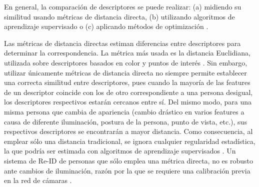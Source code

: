 \documentclass[../memoria.tex]{subfiles}
\begin{document}
En general, la comparación de descriptores se puede realizar: (a) midiendo su similitud usando métricas de distancia directa, (b) utilizando algoritmos de aprendizaje supervisado o (c) aplicando métodos de optimización \cite{mazzon2012person}.

Las métricas de distancia directas estiman diferencias entre descriptores para determinar la correspondencia. La métrica más usada es la distancia Euclidiana, utilizada sobre descriptores basados en color \cite{farenzena2010person, bak2010person} y puntos de interés \cite{gheissari2006person}. Sin embargo, utilizar únicamente métricas de distancia directa no siempre permite establecer una correcta similitud entre descriptores, pues cuando la mayoría de las features de un descriptor coincide con los de otro correspondiente a una persona desigual, los descriptores respectivos estarán cercanos entre sí. Del mismo modo, para una misma persona que cambia de apariencia (cambio drástico en varios features a causa de diferente iluminación, postura de la persona, punto de vista, etc.), sus respectivos descriptores se encontrarán a mayor distancia. Como consecuencia, al emplear sólo una distancia tradicional, se ignora cualquier regularidad estadística, la que podría ser estimada con algoritmos de aprendizaje supervisados \cite{zheng2011person, prosser2010person}. Un sistema de Re-ID de personas que sólo emplea una métrica directa, no es robusto ante cambios de iluminación, razón por la que se requiere una calibración previa en la red de cámaras \cite{gilbert2006tracking, porikli2003multi, stein1999tracking, javed2008modeling}.
\end{document}
